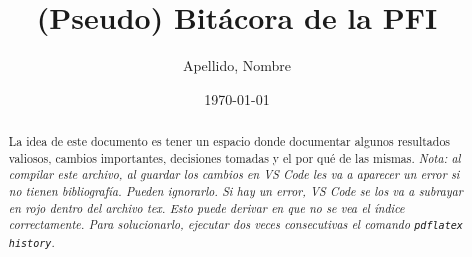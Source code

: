 \documentclass[a4paper,12pt]{article}
\begin{document}
\title{(Pseudo) Bit\'acora de la PFI}
\author{Apellido, Nombre}
\date{\today}
\maketitle

\begin{abstract}
    La idea de este documento es tener un espacio donde documentar algunos resultados valiosos, cambios importantes, decisiones tomadas y el por qu\'e de las mismas.
    \emph{Nota: al compilar este archivo, al guardar los cambios en VS Code les va a aparecer un error si no tienen bibliografía. Pueden ignorarlo. Si hay un error, VS Code se los va a subrayar en rojo dentro del archivo tex. Esto puede derivar en que no se vea el índice correctamente. Para solucionarlo, ejecutar dos veces consecutivas el comando \texttt{pdflatex history}}.
\end{abstract}

\tableofcontents
\newpage

 \newpage
 \newpage

\end{document}
